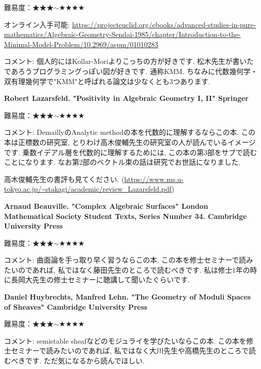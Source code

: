 難易度：★★★$\sim$★★★★\vspace{-6pt} 

オンライン入手可能: 
\url{https://projecteuclid.org/ebooks/advanced-studies-in-pure-mathematics/Algebraic-Geometry-Sendai-1985/chapter/Introduction-to-the-Minimal-Model-Problem/10.2969/aspm/01010283} 
\vspace{-6pt}

コメント: 個人的にはKollar-Moriよりこっちの方が好きです. 松木先生が書いたであろうプログラミングっぽい図が好きです. 通称KMM. ちなみに代数幾何学・双有理幾何学で"KMM"と呼ばれる論文は少なくとも3つあります. 
\vspace{8pt}

\textbf{Robert Lazarsfeld. "Positivity in Algebraic Geometry I, II" Springer} \vspace{-6pt}

難易度：★★★$\sim$★★★★\vspace{-6pt} 

コメント: DemaillyのAnalytic methodの本を代数的に理解するならこの本. この本は正標数の研究室, とりわけ高木俊輔先生の研究室の人が読んでいるイメージです. 乗数イデアル層を代数的に理解するためには, この本の第3部をサブで読むことになります. なお第2部のベクトル束の話は研究でお世話になりました. 

高木俊輔先生の書評も見てください. (\url{https://www.ms.u-tokyo.ac.jp/~stakagi/academic/review_Lazarsfeld.pdf})
\vspace{8pt}


\textbf{Arnaud Beauville. "Complex Algebraic Surfaces" London Mathematical Society Student Texts, Series Number 34. Cambridge University Press} \vspace{-6pt}

難易度：★★★$\sim$★★★★\vspace{-6pt} 

コメント: 曲面論を手っ取り早く習うならこの本. この本を修士セミナーで読みたいのであれば, 私ではなく藤田先生のところで読むべきです. 私は修士1年の時に長岡大先生の修士セミナーに聴講して聞いたぐらいです. 
\vspace{8pt}

\textbf{Daniel Huybrechts, Manfred Lehn. "The Geometry of Moduli Spaces of Sheaves" Cambridge University Press} \vspace{-6pt}

難易度：★★★$\sim$★★★★\vspace{-6pt} 

コメント: semistable sheafなどのモジュライを学びたいならこの本. この本を修士セミナーで読みたいのであれば, 私ではなく大川先生や高橋先生のところで読むべきです. ただ気になるから読んでほしい.
 \vspace{8pt}
 
